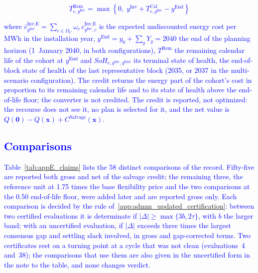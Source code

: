 \documentclass[preprint,12pt]{elsarticle}
\begin{document}
\textcolor{blue}{
    \begin{equation}
        T^\text{Rem}_{e,y^\text{Inv}} = \max\left\{0,\; y^\text{Inv} + T^\text{Cal}_{e,y^\text{Inv}} - y^\text{End}\right\}
        \label{eq:salvage_remaining_life}
    \end{equation}
}

\noindent
\textcolor{blue}{
    where $\bar{c}^{\text{Inv,E}}_{y^\text{Inv}} = \sum_{c \in \Omega_C} \omega_c\, c^{\text{Inv,E}}_{y^\text{Inv},c}$ is the expected undiscounted energy cost per MWh in the installation year, $y^\text{End} = y_0 + \sum_{y} Y_y = 2040$ the end of the planning horizon (1~January 2040, in both configurations), $T^\text{Rem}$ the remaining calendar life of the cohort at $y^\text{End}$ and $SoH_{e,y^\text{Inv},y^\text{End}}$ its terminal state of health, the end-of-block state of health of the last representative block (2035, or 2037 in the multi-scenario configuration). The credit returns the energy part of the cohort's cost in proportion to its remaining calendar life and to its state of health above the end-of-life floor; the converter is not credited. 
    The credit is reported, not optimized: the recourse does not see it, no plan is selected for it, and the net value is $Q(\boldsymbol{0}) - Q(\boldsymbol{x}) + C^\text{Salvage}(\boldsymbol{x})$.
}

\subsection{\textcolor{blue}{Comparisons}}
\label{app:results_claims}

\textcolor{blue}{
    Table~\ref{tab:appE_claims} lists the 58 distinct comparisons of the record. Fifty-five are reported both gross and net of the salvage credit; the remaining three, the reference unit at 1.75 times the base flexibility price and the two comparisons at the 0.50 end-of-life floor, were added later and are reported gross only. Each comparison is decided by the rule of~\ref{app:admm_updated_certification}: between two certified evaluations it is determinate if $|\Delta| \geq \max\{3b, 2\tau\}$, with $b$ the larger band; with an uncertified evaluation, if $|\Delta|$ exceeds three times the largest consensus gap and settling slack involved, in gross and gap-corrected terms. Two certificates rest on a turning point at a cycle that was not clean (evaluations~4 and~38); the comparisons that use them are also given in the uncertified form in the note to the table, and none changes verdict.
}
\end{document}
